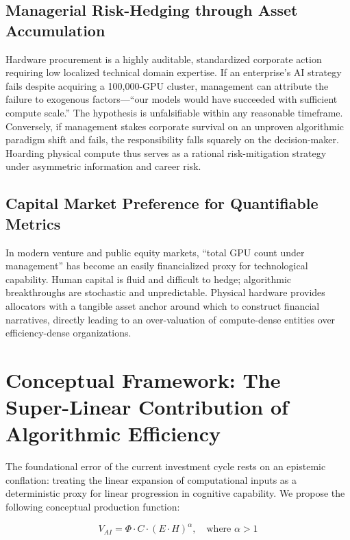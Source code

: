 \documentclass[11pt,letterpaper]{article}
\begin{document}
\subsection{Managerial Risk-Hedging through Asset Accumulation}

Hardware procurement is a highly auditable, standardized corporate action requiring low localized technical domain expertise. If an enterprise's AI strategy fails despite acquiring a 100,000-GPU cluster, management can attribute the failure to exogenous factors---``our models would have succeeded with sufficient compute scale.'' The hypothesis is unfalsifiable within any reasonable timeframe. Conversely, if management stakes corporate survival on an unproven algorithmic paradigm shift and fails, the responsibility falls squarely on the decision-maker. Hoarding physical compute thus serves as a rational risk-mitigation strategy under asymmetric information and career risk.

\subsection{Capital Market Preference for Quantifiable Metrics}

In modern venture and public equity markets, ``total GPU count under management'' has become an easily financialized proxy for technological capability. Human capital is fluid and difficult to hedge; algorithmic breakthroughs are stochastic and unpredictable. Physical hardware provides allocators with a tangible asset anchor around which to construct financial narratives, directly leading to an over-valuation of compute-dense entities over efficiency-dense organizations.

\section{Conceptual Framework: The Super-Linear Contribution of Algorithmic Efficiency}

The foundational error of the current investment cycle rests on an epistemic conflation: treating the linear expansion of computational inputs as a deterministic proxy for linear progression in cognitive capability. We propose the following conceptual production function:

\begin{equation}\label{eq:va}
V_{AI} = \Phi \cdot C \cdot (E \cdot H)^\alpha, \quad \text{where } \alpha > 1
\end{equation}
\end{document}
